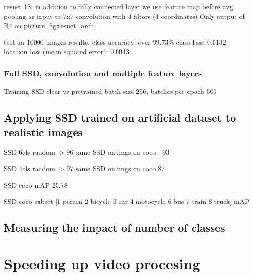 resnet 18: in addition to fully connected layer we use feature map before avg pooling as input to 7x7 convolution with 4 filters (4 coordinates) Only output of B4 on picture \cref{fig:resnet_arch} 

test on 10000 images
results: class accuracy: over 99.73\%
class loss: 0.0132
location loss (mean squared error): 0.0043



\subsubsection{Full SSD, convolution and multiple feature layers}
Training SSD clear vs pretrained
batch size 256, batches per epoch 500




\subsection{Applying SSD trained on artificial dataset to realistic images}
SSD 6cls random $>96$
same SSD on imgs on coco - 93

SSD 4cls random $>97$
same SSD on imgs on coco 87


SSD coco mAP 25.78

SSD coco subset [1 person
2 bicycle
3 car
4 motocycle
6 bus
7 train
8 truck] mAP

\subsection{Measuring the impact of number of classes}

\section{Speeding up video procesing}
